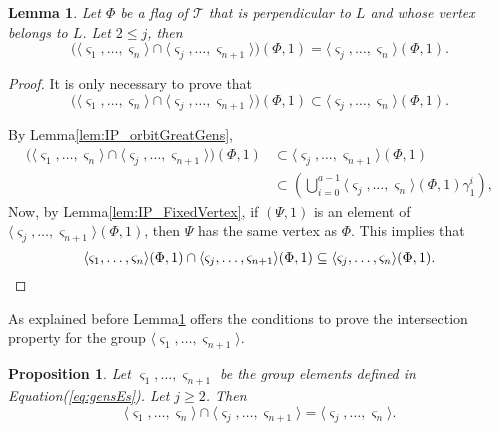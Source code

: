 \documentclass[final]{amsart}
\theoremstyle{plain}
\newtheorem{lem}[thm]{Lemma}
\newtheorem{prop}[thm]{Proposition}
\theoremstyle{definition}
\theoremstyle{remark}
\numberwithin{equation}{section}
\renewcommand{\leq}{\leqslant} \renewcommand{\geq}{\geqslant}
\renewcommand{\{}{\lbrace}
\renewcommand{\}}{\rbrace}
\newcommand{\cT}{\mathcal{T}}
\newcommand{\es}{\varsigma}
\begin{document}
\begin{lem}\label{lem:IP_orbitsSmallj}
  Let $\Phi$ be a flag of $\cT$ that is perpendicular to $L$ and whose vertex belongs to $L$. Let $2\leq j$, then
  \begin{equation}\label{eq:IP_orbits}
    \big(\langle \es_{1}, \dots, \es_{n} \rangle  \cap \langle \es_{j}, \dots, \es_{n+1} \rangle \big) (\Phi,1) = \langle \es_{j}, \dots, \es_{n} \rangle(\Phi, 1).
  \end{equation}
\end{lem}
\begin{proof}
  It is only necessary to prove that
  \[\big(\langle \es_{1}, \dots, \es_{n} \rangle \cap \langle \es_{j}, \dots, \es_{n+1} \rangle \big) (\Phi,1) \subset \langle \es_{j}, \dots, \es_{n} \rangle(\Phi, 1).\]

  By Lemma\nobreakspace \ref {lem:IP_orbitGreatGens},
  \begin{align*}
  \big(\langle \es_{1}, \dots, \es_{n} \rangle \cap \langle \es_{j}, \dots, \es_{n+1} \rangle \big) (\Phi,1)
  &\subset \langle \es_{j}, \dots, \es_{n+1} \rangle (\Phi,1) \\
  &\subset \left(\bigcup_{i=0}^{a-1} \langle \es_{j}, \dots, \es_{n}\rangle (\Phi,1)\gamma_{1}^{i}\right),
  \end{align*} 
Now, by Lemma\nobreakspace \ref {lem:IP_FixedVertex}, if $(\Psi,1)$ is an element of $\langle \es_{j}, \dots, \es_{n+1} \rangle (\Phi,1)$, then $\Psi$ has the same vertex as $\Phi$. This implies that
   \[\langle \es_{1}, \dots, \es_{n} \rangle (\Phi,1) \cap \langle \es_{j}, \dots, \es_{n+1} \rangle (\Phi,1) \subset \langle \es_{j}, \dots, \es_{n}\rangle (\Phi,1). \qedhere
  \]
\end{proof}

As explained before Lemma\nobreakspace \ref {lem:IP_orbitsSmallj} offers the conditions to prove the intersection property for the group $\langle \es_{1}, \dots, \es_{n+1} \rangle$.

\begin{prop}\label{prop:IntersectionPropertyExtension} 
  Let $\es_{1}, \dots, \es_{n+1}$ be the group elements defined in Equation\nobreakspace \textup {(\ref {eq:gensEs})}. Let $j \geq 2$. Then
  \begin{equation}\label{eq:IP_groups}
    \langle \es_{1}, \dots, \es_{n} \rangle  \cap \langle \es_{j}, \dots, \es_{n+1} \rangle  = \langle \es_{j}, \dots, \es_{n} \rangle.
  \end{equation}
\end{prop}
\end{document}
